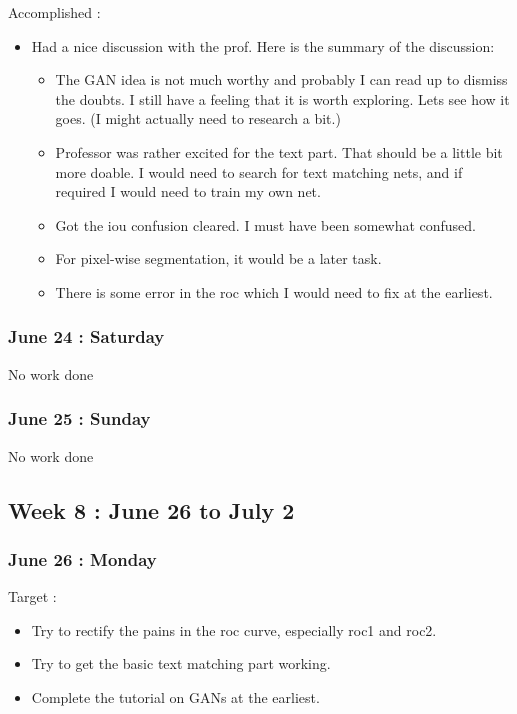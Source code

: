\documentclass{article}
\begin{document}
Accomplished :
\begin{itemize}
\item Had a nice discussion with the prof. Here is the summary of the discussion:
  \begin{itemize}
  \item The GAN idea is not much worthy and probably I can read up to dismiss the doubts. I still have a feeling that it is worth exploring. Lets see how it goes. (I might actually need to research a bit.)
  \item Professor was rather excited for the text part. That should be a little bit more doable. I would need to search for text matching nets, and if required I would need to train my own net.
  \item Got the iou confusion cleared. I must have been somewhat confused.
  \item For pixel-wise segmentation, it would be a later task.
  \item There is some error in the roc which I would need to fix at the earliest.
  \end{itemize}
\end{itemize}

\subsubsection{June 24 : Saturday}
No work done

\subsubsection{June 25 : Sunday}
No work done

\subsection{Week 8 : June 26 to July 2}
\subsubsection{June 26 : Monday}
Target :
\begin{itemize}
\item Try to rectify the pains in the roc curve, especially roc1 and roc2.
\item Try to get the basic text matching part working.
\item Complete the tutorial on GANs at the earliest.
\end{itemize}

\end{document}

